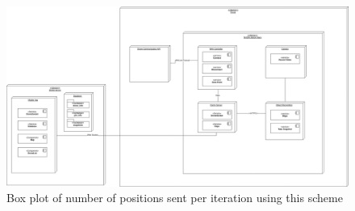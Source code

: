 \begin{figure}
    \centering
		\includegraphics[scale=0.3]{./assets/images/deployment-diagram.jpg}
    \caption{Box plot of number of positions sent per iteration using this scheme}
    \label{fig:awesome_image}
\end{figure}

